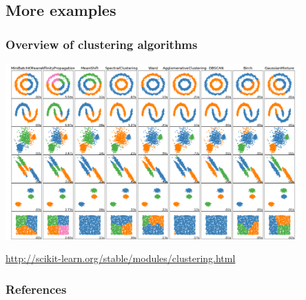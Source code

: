 \documentclass[Nike]{tuberlinbeamer}
\begin{document}
\subsection{More examples}
\begin{frame}
  \frametitle{Overview of clustering algorithms}
  \begin{center}
    \includegraphics[width=0.85\textwidth]{sklearn_doc_examples.png}
  \end{center}
  \tiny \url{http://scikit-learn.org/stable/modules/clustering.html} \cite{pedregosa2011scikit}
\end{frame}


\begin{frame}%
  \frametitle{References}
  \printbibliography
\end{frame}
\end{document}
